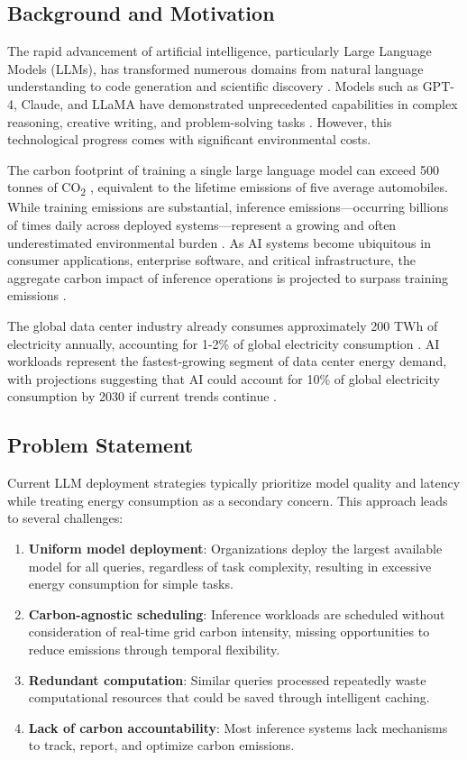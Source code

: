 \documentclass[conference]{IEEEtran}
\begin{document}
\subsection{Background and Motivation}

The rapid advancement of artificial intelligence, particularly Large Language Models (LLMs), has transformed numerous domains from natural language understanding to code generation and scientific discovery \cite{brown2020gpt3, openai2023gpt4}. Models such as GPT-4, Claude, and LLaMA have demonstrated unprecedented capabilities in complex reasoning, creative writing, and problem-solving tasks \cite{touvron2023llama}. However, this technological progress comes with significant environmental costs.

The carbon footprint of training a single large language model can exceed 500 tonnes of CO\textsubscript{2} \cite{patterson2021carbon}, equivalent to the lifetime emissions of five average automobiles. While training emissions are substantial, inference emissions—occurring billions of times daily across deployed systems—represent a growing and often underestimated environmental burden \cite{luccioni2023power}. As AI systems become ubiquitous in consumer applications, enterprise software, and critical infrastructure, the aggregate carbon impact of inference operations is projected to surpass training emissions \cite{wu2022sustainable}.

The global data center industry already consumes approximately 200 TWh of electricity annually, accounting for 1-2\% of global electricity consumption \cite{masanet2020data}. AI workloads represent the fastest-growing segment of data center energy demand, with projections suggesting that AI could account for 10\% of global electricity consumption by 2030 if current trends continue \cite{strubell2019energy}.

\subsection{Problem Statement}

Current LLM deployment strategies typically prioritize model quality and latency while treating energy consumption as a secondary concern. This approach leads to several challenges:

\begin{enumerate}
    \item \textbf{Uniform model deployment}: Organizations deploy the largest available model for all queries, regardless of task complexity, resulting in excessive energy consumption for simple tasks.
    \item \textbf{Carbon-agnostic scheduling}: Inference workloads are scheduled without consideration of real-time grid carbon intensity, missing opportunities to reduce emissions through temporal flexibility.
    \item \textbf{Redundant computation}: Similar queries processed repeatedly waste computational resources that could be saved through intelligent caching.
    \item \textbf{Lack of carbon accountability}: Most inference systems lack mechanisms to track, report, and optimize carbon emissions.
\end{enumerate}
\end{document}
